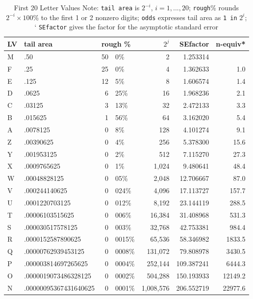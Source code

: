 \documentclass[oneside]{article}
\begin{document}
\begin{table}
\begin{tabular}{llr@{.}lrrr}\hline
LV & tail area & \multicolumn{2}{l}{rough \%} & $2^j$ & SEfactor & n-equiv*\\ \hline
 M & .50 & 50&0\% & 2 & 1.253314 \\
 F & .25 & 25& 0\% & 4 & 1.362633 & 1.0\\
 E & .125 & 12& 5\% & 8 & 1.606574 & 1.4\\
 D & .0625 & 6& 25\% & 16 & 1.968236 & 2.1\\
 C & .03125 & 3&13\% & 32 & 2.472133 & 3.3\\
 B & .015625 & 1&56\% & 64 & 3.162020 & 5.4\\
 A & .0078125 & 0&8\% & 128 & 4.101274 & 9.1\\
 Z & .00390625 & 0&4\% & 256 & 5.378300 & 15.6\\
 Y & .001953125 & 0&2\% & 512 & 7.115270 & 27.3\\
 X & .0009765625 & 0&1\% & 1,024 & 9.480641 & 48.4\\
 W & .00048828125 & 0&05\% & 2,048 & 12.706667 & 87.0  \\
 V & .000244140625 & 0&024\% & 4,096 & 17.113727 & 157.7\\
 U & .0001220703125 & 0&012\% & 8,192 & 23.144119 & 288.5\\
 T & .00006103515625 & 0&006\% & 16,384 & 31.408968 & 531.3\\
 S & .000030517578125 & 0&003\% & 32,768 & 42.753381 & 984.4\\
 R & .0000152587890625 & 0&0015\% & 65,536 & 58.346982 & 1833.5\\
 Q & .00000762939453125 & 0&0008\% & 131,072 & 79.808978 & 3430.5\\
 P & .000003814697265625 & 0&0004\% & 252,144 & 109.387241 & 6444.3\\
 O & .0000019073486328125 & 0&0002\% & 504,288 & 150.193933 & 12149.2\\
 N & .00000095367431640625 & 0&0001\% &1,008,576 & 206.552719 & 22977.6\\\hline
\end{tabular}
\caption{First 20 Letter Values \newline
{\small Note: \texttt{tail area} is $2 ^{-i}$, $i = 1, ..., 20$; 
\texttt{rough}\% rounds $2 ^{-i} \times 100$\%
   to the first 1 or 2 nonzero digits; 
\texttt{odds} expresses tail area as \texttt{1 in} $2^i$; `
\texttt{SEfactor} gives the factor for the asymptotic standard error
}}
\end{table}
\end{document}
